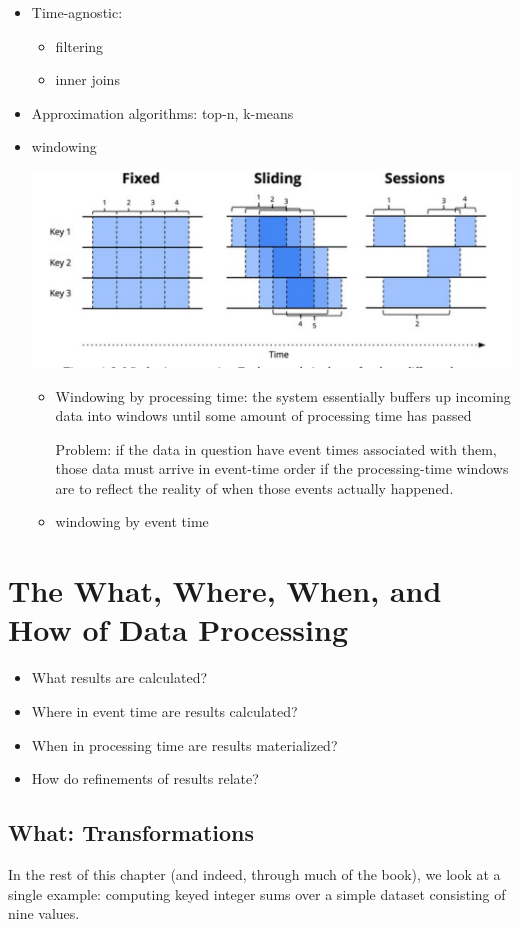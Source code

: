 \documentclass[11pt]{article}
\begin{document}
\begin{itemize}
\item Time-agnostic:
\begin{itemize}
\item filtering
\item inner joins
\end{itemize}
\item Approximation algorithms: top-n, k-means
\item windowing
\begin{center}
\includegraphics[width=.8\textwidth]{../images/streamingsystems/1.png}
\label{}
\end{center}
\begin{itemize}
\item Windowing by processing time: the system essentially buffers up incoming data into windows
until some amount of processing time has passed

Problem: if the data in question have event times associated with them, those data must
arrive in event-time order if the processing-time windows are to reflect the reality of when
those events actually happened.
\item windowing by event time
\end{itemize}
\end{itemize}

\section{The What, Where, When, and How of Data Processing}
\label{sec:orgad440ef}
\begin{itemize}
\item What results are calculated?
\item Where in event time are results calculated?
\item When in processing time are results materialized?
\item How do refinements of results relate?
\end{itemize}
\subsection{What: Transformations}
\label{sec:org57e5253}
In the rest of this chapter (and indeed, through much of the book), we look at a single example:
computing keyed integer sums over a simple dataset consisting of nine values.
\end{document}
